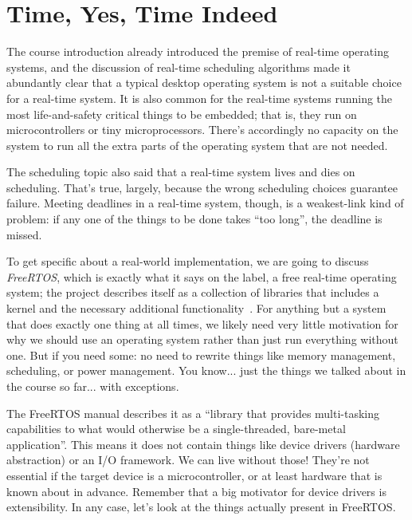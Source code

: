 




\section*{Time, Yes, Time Indeed}

The course introduction already introduced the premise of real-time operating systems, and the discussion of real-time scheduling algorithms made it abundantly clear that a typical desktop operating system is not a suitable choice for a real-time system. It is also common for the real-time systems running the most life-and-safety critical things to be embedded; that is, they run on microcontrollers or tiny microprocessors. There's accordingly no capacity on the system to run all the extra parts of the operating system that are not needed. 

The scheduling topic also said that a real-time system lives and dies on scheduling. That's true, largely, because the wrong scheduling choices guarantee failure. Meeting deadlines in a real-time system, though, is a weakest-link kind of problem: if any one of the things to be done takes ``too long'', the deadline is missed.

 To get specific about a real-world implementation, we are going to discuss \textit{FreeRTOS}, which is exactly what it says on the label, a free real-time operating system; the project describes itself as a collection of libraries that includes a kernel and the necessary additional functionality~\cite{freertos}. For anything but a system that does exactly one thing at all times, we likely need very little motivation for why we should use an operating system rather than just run everything without one. But if you need some: no need to rewrite things like memory management, scheduling, or power management. You know... just the things we talked about in the course so far... with exceptions.
 
 The FreeRTOS manual describes it as a ``library that provides multi-tasking capabilities to what would otherwise be a single-threaded, bare-metal application''. This means it does not contain things like device drivers (hardware abstraction) or an I/O framework. We can live without those! They're not essential if the target device is a microcontroller, or at least hardware that is known about in advance. Remember that a big motivator for device drivers is extensibility. In any case, let's look at the things actually present in FreeRTOS.
 
